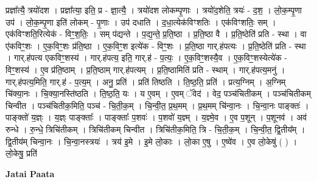 \documentclass[17pt]{extarticle}
\begin{document}
प्रज्ञा᳚त्यै॒ त्रयो॑दश । प्रज्ञा᳚त्या॒ इति॒ प्र - ज्ञा॒त्यै॒ । त्रयो॑दश लोकम्पृ॒णाः । त्रयो॑द॒शेति॒ त्रयः॑ - द॒श॒ । लो॒क॒म्पृ॒णा उप॑ । लो॒क॒म्पृ॒णा इति॑ लोकम् - पृ॒णाः । उप॑ दधाति । द॒धा॒त्येक॑विꣳशतिः । एक॑विꣳशतिः॒ सम् । एक॑विꣳशति॒रित्येक॑ - विꣳ॒॒श॒तिः॒ । सम् प॑द्यन्ते । प॒द्य॒न्ते॒ प्र॒ति॒ष्ठा । प्र॒ति॒ष्ठा वै । प्र॒ति॒ष्ठेति॑ प्रति - स्था । वा ए॑कविꣳ॒॒शः । ए॒क॒विꣳ॒॒शः प्र॑ति॒ष्ठा । ए॒क॒विꣳ॒॒श इत्ये॑क - विꣳ॒॒शः । प्र॒ति॒ष्ठा गार्.ह॑पत्यः । प्र॒ति॒ष्ठेति॑ प्रति - स्था । गार्.ह॑पत्य एकविꣳ॒॒शस्य॑ । गार्.ह॑पत्य॒ इति॒ गार्.ह॑ - प॒त्यः॒ । ए॒क॒विꣳ॒॒शस्यै॒व । ए॒क॒विꣳ॒॒शस्येत्ये॑क - विꣳ॒॒शस्य॑ । ए॒व प्र॑ति॒ष्ठाम् । प्र॒ति॒ष्ठाम् गार्.ह॑पत्यम् । प्र॒ति॒ष्ठामिति॑ प्रति - स्थाम् । गार्.ह॑पत्य॒मनु॑ । गार्.ह॑पत्य॒मिति॒ गार्.ह॑ - प॒त्य॒म् । अनु॒ प्रति॑ । प्रति॑ तिष्ठति । ति॒ष्ठ॒ति॒ प्रति॑ । प्रत्य॒ग्निम् । अ॒ग्निम् चि॑क्या॒नः । चि॒क्या॒नस्ति॑ष्ठति । ति॒ष्ठ॒ति॒ यः । य ए॒वम् । ए॒वम् ॅवेद॑ । वेद॒ पञ्च॑चितीकम् । पञ्च॑चितीकम् चिन्वीत । पञ्च॑चितीक॒मिति॒ पञ्च॑ - चि॒ती॒क॒म् । चि॒न्वी॒त॒ प्र॒थ॒मम् । प्र॒थ॒मम् चि॑न्वा॒नः । चि॒न्वा॒नः पाङ्क्तः॑ । पाङ्क्तो॑ य॒ज्ञ्ः । य॒ज्ञ्ः पाङ्क्ताः᳚ । पाङ्क्ताः᳚ प॒शवः॑ । प॒शवो॑ य॒ज्ञ्म् । य॒ज्ञ्मे॒व । ए॒व प॒शून् । प॒शूनव॑ । अव॑ रुन्धे । रु॒न्धे॒ त्रिचि॑तीकम् । त्रिचि॑तीकम् चिन्वीत । त्रिचि॑तीक॒मिति॒ त्रि - चि॒ती॒क॒म् । चि॒न्वी॒त॒ द्वि॒तीय᳚म् । द्वि॒तीय॑म् चिन्वा॒नः । चि॒न्वा॒नस्त्रयः॑ । त्रय॑ इ॒मे । इ॒मे लो॒काः । लो॒का ए॒षु । ए॒ष्वे॑व । ए॒व लो॒केषु॑ ( ) । लो॒केषु॒ प्रति॑ \newline

\textbf{Jatai Paata} \newline
\end{document}
